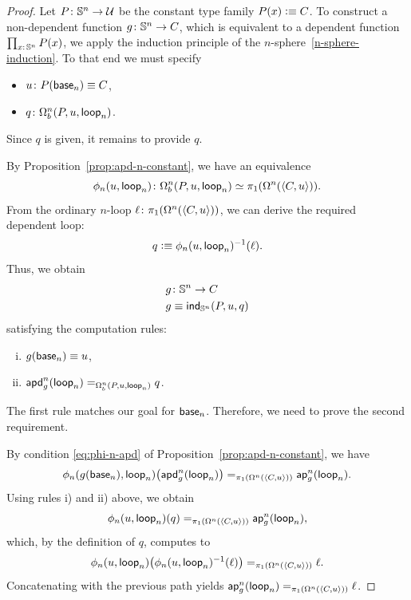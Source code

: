 \begin{proof}
    Let $P\colon\sphere^n\to\univ$ be the constant type family $P(x)\mathrel{\vcentcolon}\equiv C$. To construct a non-dependent function $g\colon\sphere^n\to C$, which is equivalent to a dependent function $\prod_{x\colon\sphere^n} P(x)$, we apply the induction principle of the $n$-sphere~\ref{n-sphere-induction}. To that end we must specify
    \begin{itemize}
        \item $u\colon P(\fun{base}_n)\equiv C$,
        
        \item $q\colon\Omega^n_b(P,u,\fun{loop}_n)$.
    \end{itemize}
    Since $q$ is given, it remains to provide $q$.
    
    By Proposition~\ref{prop:apd-n-constant}, we have an equivalence
    \[
        \phi_n(u, \fun{loop}_n)\colon \Omega^n_b(P,u,\fun{loop}_n) \simeq \pi_1(\Omega^n(\dep{C,u})).
    \]
    From the ordinary $n$-loop $\ell\colon\pi_1(\Omega^n(\dep{C,u}))$, we can derive the required dependent loop:
    \[
        q\mathrel{\vcentcolon}\equiv\phi_n(u,\mathsf{loop}_n)^{-1}(\ell).
    \]
    Thus, we obtain
    \begin{align*}
        g&\colon\sphere^n\to C\\
        g&\equiv\fun{ind}_{\sphere^n}(P,u,q)
    \end{align*}
    satisfying the computation rules:
    \begin{enumerate}[i)]
        \item $g(\mathsf{base}_n) \equiv u$,
        \item $\mathsf{apd}^n_g(\mathsf{loop}_n) \mathrel{=_{\Omega^n_b(P,u,\mathsf{loop}_n)}} q$.
    \end{enumerate}
    The first rule matches our goal for $\mathsf{base}_n$. Therefore, we need to prove the second requirement.
    
    By condition \eqref{eq:phi-n-apd} of Proposition~\ref{prop:apd-n-constant}, we have
    \[
        \phi_n(g(\mathsf{base}_n), \mathsf{loop}_n)\bigl(\mathsf{apd}^n_g(\mathsf{loop}_n)\bigr) \mathrel{=_{\pi_1(\Omega^n(\langle C,u\rangle))}} \mathsf{ap}^n_g(\mathsf{loop}_n).
    \]
    Using rules i) and ii) above, we obtain
    \[
        \phi_n(u, \mathsf{loop}_n)(q) \mathrel{=_{\pi_1(\Omega^n(\langle C,u\rangle))}} \mathsf{ap}^n_g(\mathsf{loop}_n),
    \]
    which, by the definition of $q$, computes to
    \[
        \phi_n(u,\mathsf{loop}_n)
            \bigl(
                \phi_n(u,\mathsf{loop}_n)^{-1}(\ell)
            \bigr)
            \mathrel{=_{\pi_1(\Omega^n(\langle C,u\rangle))}}
            \ell.
    \]
    Concatenating with the previous path yields $\mathsf{ap}^n_g(\mathsf{loop}_n) \mathrel{=_{\pi_1(\Omega^n(\langle C,u\rangle))}}\ell$.
    
\end{proof}


